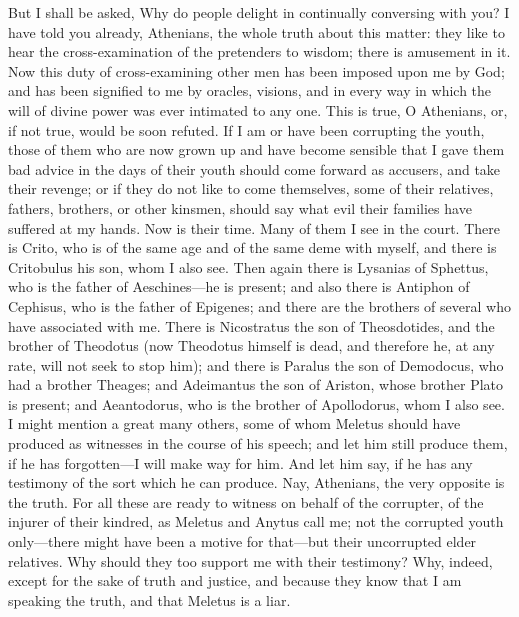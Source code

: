 \documentclass[11pt,letter]{article}
\begin{document}
\par  But I shall be asked, Why do people delight in continually conversing with you? I have told you already, Athenians, the whole truth about this matter: they like to hear the cross-examination of the pretenders to wisdom; there is amusement in it. Now this duty of cross-examining other men has been imposed upon me by God; and has been signified to me by oracles, visions, and in every way in which the will of divine power was ever intimated to any one. This is true, O Athenians, or, if not true, would be soon refuted. If I am or have been corrupting the youth, those of them who are now grown up and have become sensible that I gave them bad advice in the days of their youth should come forward as accusers, and take their revenge; or if they do not like to come themselves, some of their relatives, fathers, brothers, or other kinsmen, should say what evil their families have suffered at my hands. Now is their time. Many of them I see in the court. There is Crito, who is of the same age and of the same deme with myself, and there is Critobulus his son, whom I also see. Then again there is Lysanias of Sphettus, who is the father of Aeschines—he is present; and also there is Antiphon of Cephisus, who is the father of Epigenes; and there are the brothers of several who have associated with me. There is Nicostratus the son of Theosdotides, and the brother of Theodotus (now Theodotus himself is dead, and therefore he, at any rate, will not seek to stop him); and there is Paralus the son of Demodocus, who had a brother Theages; and Adeimantus the son of Ariston, whose brother Plato is present; and Aeantodorus, who is the brother of Apollodorus, whom I also see. I might mention a great many others, some of whom Meletus should have produced as witnesses in the course of his speech; and let him still produce them, if he has forgotten—I will make way for him. And let him say, if he has any testimony of the sort which he can produce. Nay, Athenians, the very opposite is the truth. For all these are ready to witness on behalf of the corrupter, of the injurer of their kindred, as Meletus and Anytus call me; not the corrupted youth only—there might have been a motive for that—but their uncorrupted elder relatives. Why should they too support me with their testimony? Why, indeed, except for the sake of truth and justice, and because they know that I am speaking the truth, and that Meletus is a liar.
\end{document}
